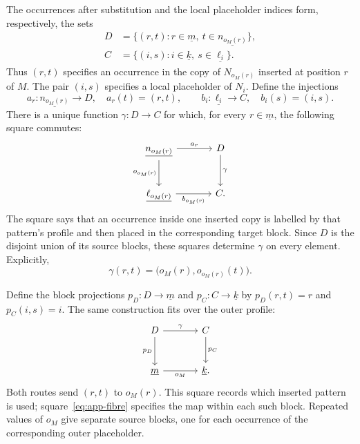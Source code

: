 \documentclass[11pt]{article}
\begin{document}
The occurrences after substitution and the local placeholder indices
form, respectively, the sets
\[
 \begin{aligned}
 D&=\{(r,t):r\in\underline m,\ t\in\underline{n_{o_M(r)}}\},\\
 C&=\{(i,s):i\in\underline k,\ s\in\underline{\ell_i}\}.
 \end{aligned}
\]
Thus $(r,t)$ specifies an occurrence in the copy of $N_{o_M(r)}$
inserted at position $r$ of $M$. The pair $(i,s)$ specifies a local
placeholder of $N_i$. Define the injections
\[
 a_r:\underline{n_{o_M(r)}}\longrightarrow D,\quad a_r(t)=(r,t),
 \qquad
 b_i:\underline{\ell_i}\longrightarrow C,\quad b_i(s)=(i,s).
\]
There is a unique function $\gamma:D\to C$ for which, for every
$r\in\underline m$, the following square commutes:
\begin{equation}\label{eq:app-fibre}
\begin{tikzcd}[column sep=large,row sep=large]
 \underline{n_{o_M(r)}}\arrow[r,"a_r"]\arrow[d,"o_{o_M(r)}"']
   &D\arrow[d,"\gamma"]\\
 \underline{\ell_{o_M(r)}}\arrow[r,"b_{o_M(r)}"']&C.
\end{tikzcd}
\end{equation}
The square says that an occurrence inside one inserted copy is labelled
by that pattern's profile and then placed in the corresponding target
block. Since $D$ is the disjoint union of its source blocks, these
squares determine $\gamma$ on every element. Explicitly,
\[
 \gamma(r,t)=\bigl(o_M(r),o_{o_M(r)}(t)\bigr).
\]

Define the block projections $p_D:D\to\underline m$ and
$p_C:C\to\underline k$ by $p_D(r,t)=r$ and $p_C(i,s)=i$.
The same construction fits over the outer profile:
\begin{equation}\label{eq:app-profile}
\begin{tikzcd}[column sep=large,row sep=large]
 D\arrow[r,"\gamma"]\arrow[d,"p_D"']&C\arrow[d,"p_C"]\\
 \underline m\arrow[r,"o_M"']&\underline k.
\end{tikzcd}
\end{equation}
Both routes send $(r,t)$ to $o_M(r)$. This square records which
inserted pattern is used; square~\eqref{eq:app-fibre} specifies the
map within each such block. Repeated values of $o_M$ give separate
source blocks, one for each occurrence of the corresponding outer
placeholder.
\end{document}
